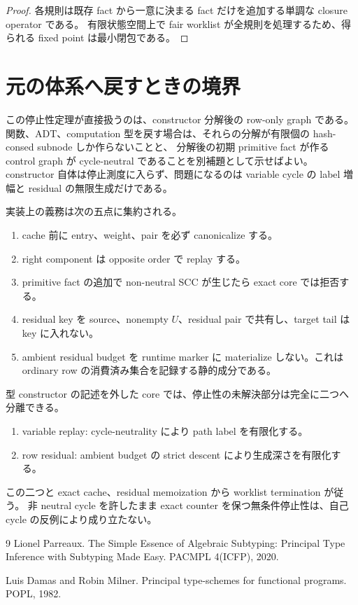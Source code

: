 \documentclass[uplatex,dvipdfmx,a4paper,10.5pt]{jsarticle}
\theoremstyle{jpplain}
\begin{document}
\begin{proof}
各規則は既存 fact から一意に決まる fact だけを追加する単調な closure operator である。
有限状態空間上で fair worklist が全規則を処理するため、得られる fixed point は最小閉包である。
\end{proof}


\section{元の体系へ戻すときの境界}

\begin{intuitionbox}
この停止性定理が直接扱うのは、constructor 分解後の row-only graph である。
関数、ADT、computation 型を戻す場合は、それらの分解が有限個の hash-consed subnode しか作らないことと、
分解後の初期 primitive fact が作る control graph が cycle-neutral であることを別補題として示せばよい。
constructor 自体は停止測度に入らず、問題になるのは variable cycle の label 増幅と residual の無限生成だけである。
\end{intuitionbox}

実装上の義務は次の五点に集約される。

\begin{enumerate}
  \item cache 前に entry、weight、pair を必ず canonicalize する。
  \item right component は opposite order で replay する。
  \item primitive fact の追加で non-neutral SCC が生じたら exact core では拒否する。
  \item residual key を source、nonempty $U$、residual pair で共有し、target tail は key に入れない。
  \item ambient residual budget を runtime marker に materialize しない。これは ordinary row の消費済み集合を記録する静的成分である。
\end{enumerate}

\begin{statusbox}
型 constructor の記述を外した core では、停止性の未解決部分は完全に二つへ分離できる。

\begin{enumerate}
  \item variable replay: cycle-neutrality により path label を有限化する。
  \item row residual: ambient budget の strict descent により生成深さを有限化する。
\end{enumerate}

この二つと exact cache、residual memoization から worklist termination が従う。
非 neutral cycle を許したまま exact counter を保つ無条件停止性は、自己 cycle の反例により成り立たない。
\end{statusbox}

\begin{thebibliography}{9}
Lionel Parreaux.
\newblock The Simple Essence of Algebraic Subtyping: Principal Type Inference with Subtyping Made Easy.
\newblock PACMPL 4(ICFP), 2020.

Luis Damas and Robin Milner.
\newblock Principal type-schemes for functional programs.
\newblock POPL, 1982.
\end{thebibliography}
\end{document}
